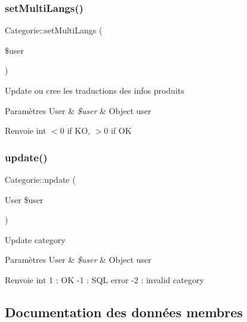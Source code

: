 \subsubsection{\texorpdfstring{set\+Multi\+Langs()}{setMultiLangs()}}
{\footnotesize\ttfamily Categorie\+::set\+Multi\+Langs (\begin{DoxyParamCaption}\item[{}]{\$user }\end{DoxyParamCaption})}

Update ou cree les traductions des infos produits


\begin{DoxyParams}[1]{Paramètres}
User & {\em \$user} & Object user\\
\hline
\end{DoxyParams}
\begin{DoxyReturn}{Renvoie}
int $<$0 if KO, $>$0 if OK 
\end{DoxyReturn}
\mbox{\label{classCategorie_ad7f52b3a7530b26a57c1d0878be65e00}} 
\subsubsection{\texorpdfstring{update()}{update()}}
{\footnotesize\ttfamily Categorie\+::update (\begin{DoxyParamCaption}\item[{User}]{\$user }\end{DoxyParamCaption})}

Update category


\begin{DoxyParams}[1]{Paramètres}
User & {\em \$user} & Object user \\
\hline
\end{DoxyParams}
\begin{DoxyReturn}{Renvoie}
int 1 \+: OK -\/1 \+: S\+QL error -\/2 \+: invalid category 
\end{DoxyReturn}


\subsection{Documentation des données membres}
\mbox{\label{classCategorie_a1c8f9c63e3d47b800fa005c1d2d4cbe8}} 
